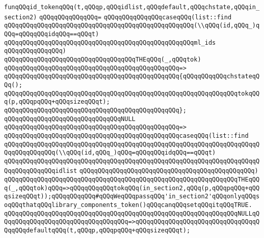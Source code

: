 \newline
\verb|funqQQqid_tokenqQQq(t,qQQqp,qQQqidlist,qQQqdefault,qQQqchstate,qQQqin_section2)|\newline
\verb|qQQqqQQqqQQqqQQq=|\newline
\verb|qQQqqQQqqQQqqQQqcaseqQQq(list::find|\newline
\verb|qQQqqQQqqQQqqQQqqQQqqQQqqQQqqQQqqQQqqQQqqQQqqQQqqQQq(\\qQQq(id,qQQq_)qQQq=qQQqqQQqidqQQq==qQQqt)|\newline
\verb|qQQqqQQqqQQqqQQqqQQqqQQqqQQqqQQqqQQqqQQqqQQqqQQqqQQqml_ids|\newline
\verb|qQQqqQQqqQQqqQQq)|\newline
\newline
\verb|qQQqqQQqqQQqqQQqqQQqqQQqqQQqqQQqqQQqTHEqQQq(_,qQQqtok)|\newline
\verb|qQQqqQQqqQQqqQQqqQQqqQQqqQQqqQQqqQQqqQQqqQQqqQQq=>|\newline
\verb|qQQqqQQqqQQqqQQqqQQqqQQqqQQqqQQqqQQqqQQqqQQqqQQq{qQQqqQQqqQQqchstateqQQq();|\newline
\verb|qQQqqQQqqQQqqQQqqQQqqQQqqQQqqQQqqQQqqQQqqQQqqQQqqQQqqQQqqQQqqQQqtokqQQq(p,qQQqpqQQq+qQQqsizeqQQqt);|\newline
\verb|qQQqqQQqqQQqqQQqqQQqqQQqqQQqqQQqqQQqqQQqqQQqqQQq};|\newline
\newline
\verb|qQQqqQQqqQQqqQQqqQQqqQQqqQQqqQQqNULL|\newline
\verb|qQQqqQQqqQQqqQQqqQQqqQQqqQQqqQQqqQQqqQQqqQQqqQQq=>|\newline
\verb|qQQqqQQqqQQqqQQqqQQqqQQqqQQqqQQqqQQqqQQqqQQqqQQqcaseqQQq(list::find|\newline
\verb|qQQqqQQqqQQqqQQqqQQqqQQqqQQqqQQqqQQqqQQqqQQqqQQqqQQqqQQqqQQqqQQqqQQqqQQqqQQqqQQqqQQq(\\qQQq(id,qQQq_)qQQq=qQQqqQQqidqQQq==qQQqt)|\newline
\verb|qQQqqQQqqQQqqQQqqQQqqQQqqQQqqQQqqQQqqQQqqQQqqQQqqQQqqQQqqQQqqQQqqQQqqQQqqQQqqQQqqQQqidlist|\newline
\verb|qQQqqQQqqQQqqQQqqQQqqQQqqQQqqQQqqQQqqQQqqQQqqQQq)|\newline
\verb|qQQqqQQqqQQqqQQqqQQqqQQqqQQqqQQqqQQqqQQqqQQqqQQqqQQqqQQqqQQqqQQqTHEqQQq(_,qQQqtok)qQQq=>qQQqqQQqqQQqtokqQQq(in_section2,qQQq(p,qQQqpqQQq+qQQqsizeqQQqt));qQQqqQQqqQQq#qQQqWeqQQqpassqQQq'in_section2'qQQqonlyqQQqsoqQQqthatqQQqlibrary_components_token()qQQqcanqQQqsetqQQqitqQQqTRUE.|\newline
\verb|qQQqqQQqqQQqqQQqqQQqqQQqqQQqqQQqqQQqqQQqqQQqqQQqqQQqqQQqqQQqqQQqNULLqQQqqQQqqQQqqQQqqQQqqQQqqQQqqQQqqQQq=>qQQqqQQqqQQqqQQqqQQqqQQqqQQqqQQqqQQqqQQqdefaultqQQq(t,qQQqp,qQQqpqQQq+qQQqsizeqQQqt);|\newline
